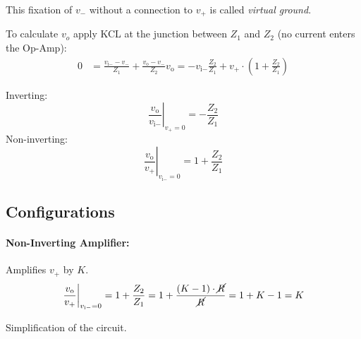 		This fixation of $v_-$ without a connection to $v_+$ is called \emph{virtual ground}.
		
		To calculate $v_o$ apply KCL at the junction between $Z_1$ and $Z_2$ (no current enters the Op-Amp):
			\begin{align*}
				0 &= \frac{v_{\text{i}-}-v_-}{Z_1} + \frac{v_\text{o} - v_-}{Z_2}
				v_{\text{o}} = -v_{\text{i}-} \frac{Z_2}{Z_1} + v_+ \cdot \left(1+ \frac{Z_2}{Z_1}\right)
			\end{align*}

		\begin{wrapfigure}[0]{r}{.5\columnwidth}
			\vspace{-8.5mm}
		\end{wrapfigure}

		Inverting:\[
			\left.\frac{v_{\text{o}}}{v_{\text{i}-}}\right|_{v_+ = 0} = -\frac{Z_2}{Z_1}
		\]
		Non-inverting:\[
			\left.\frac{v_{\text{o}}}{v_+}\right|_{v_{\text{i}-} = 0} = 1 + \frac{Z_2}{Z_1}
		\]
	
	\subsection{Configurations} %
		\paragraph{Non-Inverting Amplifier:} %
			Amplifies $v_+$ by $K$.
			\begin{gather*}
				\left.\frac{v_{\text{o}}}{v_+}\right|_{v_{\text{i}-} = 0} = 1 + \frac{Z_2}{Z_1} = 1 + \frac{(K-1)\cdot \cancel{R}}{\cancel{R}} = 1 + K - 1 = K
			\end{gather*}
			
			\begin{center}
				Simplification of the circuit.
			\end{center}
